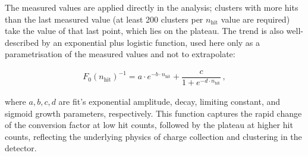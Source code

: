 The measured values are applied directly in the analysis; clusters with more hits than the last measured value (at least 200 clusters per $n_\text{hit}$ value are required) take the value of that last point, which lies on the plateau. The trend is also well-described by an exponential plus logistic function, used here only as a parametrisation of the measured values and not to extrapolate:

\begin{align}
   F_0(n_{\text{hit}})^{-1} = a \cdot e^{-b \cdot n_{\text{hit}}} + \dfrac{c}{1 + e^{-d \cdot n_{\text{hit}}}}\,,
\end{align}

where \( a, b, c, d \) are fit's exponential amplitude, decay, limiting constant, and sigmoid growth parameters, respectively. This function captures the rapid change of the conversion factor at low hit counts, followed by the plateau at higher hit counts, reflecting the underlying physics of charge collection and clustering in the detector.